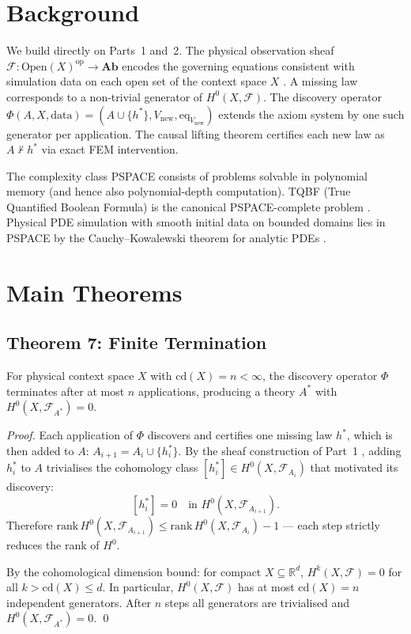 \documentclass[twoside,11pt]{article}
\newcommand{\FA}{\mathcal{F}}
\newcommand{\cd}{\mathrm{cd}}
\begin{document}
\section{Background}
\label{sec:background}

We build directly on Parts~1 and~2. The physical observation sheaf
$\FA : \mathrm{Open}(X)^{\mathrm{op}} \to \mathbf{Ab}$ encodes the
governing equations consistent with simulation data on each open set
of the context space $X$ \citep{forgwm2026part1}. A missing law
corresponds to a non-trivial generator of $H^0(X, \FA)$. The discovery
operator $\Phi(A, X, \mathrm{data}) = (A \cup \{h^*\}, V_{\mathrm{new}},
\mathrm{eq}_{V_{\mathrm{new}}})$ extends the axiom system by one
such generator per application. The causal lifting theorem
\citep{forgwm2026part2} certifies each new law as $A \nvdash h^*$ via
exact FEM intervention.

The complexity class \textrm{PSPACE} consists of problems solvable
in polynomial memory (and hence also polynomial-depth computation).
TQBF (True Quantified Boolean Formula) is the canonical
\textrm{PSPACE}-complete problem \citep{stockmeyer1973word}.
Physical PDE simulation with smooth initial data on bounded domains
lies in \textrm{PSPACE} by the Cauchy--Kowalewski theorem for
analytic PDEs \citep{papadimitriou1994computational}.

\section{Main Theorems}
\label{sec:theorems}

\subsection{Theorem 7: Finite Termination}

\begin{theorem}
\label{thm:termination}
For physical context space $X$ with $\cd(X) = n < \infty$, the
discovery operator $\Phi$ terminates after at most $n$ applications,
producing a theory $A^*$ with $H^0(X, \FA_{A^*}) = 0$.
\end{theorem}

\begin{proof}
Each application of $\Phi$ discovers and certifies one missing law
$h^*$, which is then added to $A$: $A_{i+1} = A_i \cup \{h^*_i\}$.
By the sheaf construction of Part~1 \citep{forgwm2026part1}, adding
$h^*_i$ to $A$ trivialises the cohomology class $[h^*_i] \in H^0(X,
\FA_{A_i})$ that motivated its discovery:
\[
  [h^*_i] = 0 \quad\text{in } H^0(X, \FA_{A_{i+1}}).
\]
Therefore $\mathrm{rank}\, H^0(X, \FA_{A_{i+1}}) \leq
\mathrm{rank}\, H^0(X, \FA_{A_i}) - 1$ --- each step strictly
reduces the rank of $H^0$.

By the cohomological dimension bound: for compact $X \subseteq
\mathbb{R}^d$, $H^k(X, \FA) = 0$ for all $k > \cd(X) \leq d$.
In particular, $H^0(X, \FA)$ has at most $\cd(X) = n$ independent
generators. After $n$ steps all generators are trivialised and
$H^0(X, \FA_{A^*}) = 0$. \qed
\end{proof}
\end{document}
